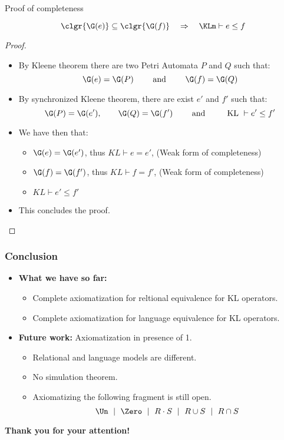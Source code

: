\begin{frame}{Proof of completeness}
 \begin{theorem}[Completeness]
  $$ \clgr{\G(e)} \subseteq \clgr{\G(f)}  
  \quad\Rightarrow\quad \text{\KLm} \vdash  e \leq f$$
  \end{theorem}
\begin{proof}
\begin{itemize}
\item By Kleene theorem there are two Petri Automata $P$ and $Q$ such that:
$$ \G(e)=\G(P) \qquad \text{ and }\qquad \G(f)=\G(Q)$$
\item By synchronized Kleene theorem, there are exist $e'$ and $f'$ such that:
$$ \G(P)=\G(e'), \qquad \G(Q)=\G(f')  \qquad \text{ and } \qquad \text{ KL } \vdash e' \leq f'$$
\item We have then that:
  \begin{itemize}
  \item $\G(e)=\G(e')$, thus $KL \vdash e=e'$, \hfill (Weak form of completeness)
  \item $\G(f)=\G(f')$, thus $KL \vdash f=f'$, \hfill (Weak form of completeness)
  \item  $KL \vdash e'\leq f'$
  \end{itemize}
  \item This concludes the proof.
\end{itemize}
\end{proof}
\end{frame}
\begin{frame}\frametitle{Conclusion}
\vfill
\begin{itemize}
\item \textbf{What we have so far:}\vfill
\begin{itemize}
\item Complete axiomatization for reltional equivalence for KL operators.\vfill
\item Complete axiomatization for language equivalence for KL operators.\vfill
\end{itemize}
\item \textbf{Future work:} Axiomatization in presence of 1.\vfill
\begin{itemize}
\item Relational and language models are different.\vfill
\item No simulation theorem.\vfill
\item Axiomatizing the following fragment is still open. \vfill
$$\Un\ \mid\ \Zero\ \mid\ R\cdot S\ \mid\  R\cup S\ \mid \ R\cap S$$ 
\end{itemize}
\end{itemize}
\pause
\begin{center}
\textbf{Thank you for your attention!}
\end{center}
\end{frame}


